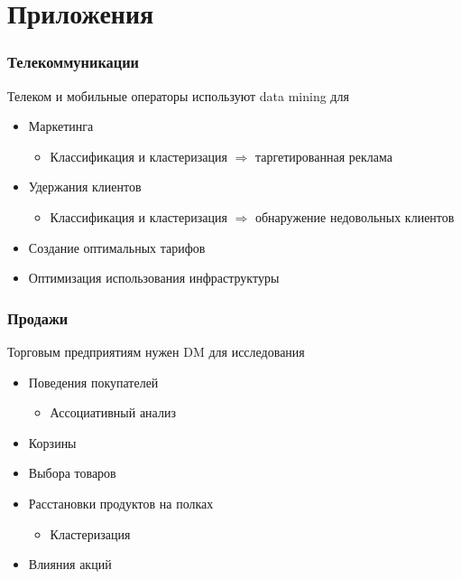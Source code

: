 \section{Приложения}
\begin{frame}
    \frametitle{Телекоммуникации}

    Телеком и мобильные операторы используют data mining для
    \begin{itemize}
        \item Маркетинга
              \begin{itemize}
                  \item Классификация и кластеризация $\Rightarrow$ таргетированная реклама
              \end{itemize}
        \item Удержания клиентов
              \begin{itemize}
                  \item Классификация и кластеризация $\Rightarrow$ обнаружение недовольных клиентов
              \end{itemize}
        \item Создание оптимальных тарифов
        \item Оптимизация использования инфраструктуры
    \end{itemize}

\end{frame}

\begin{frame}
    \frametitle{Продажи}

    Торговым предприятиям нужен DM для исследования
    \begin{itemize}
        \item Поведения покупателей
              \begin{itemize}
                  \item Ассоциативный анализ
              \end{itemize}
        \item Корзины
        \item Выбора товаров
        \item Расстановки продуктов на полках
              \begin{itemize}
                  \item Кластеризация
              \end{itemize}
        \item Влияния акций
    \end{itemize}

\end{frame}

